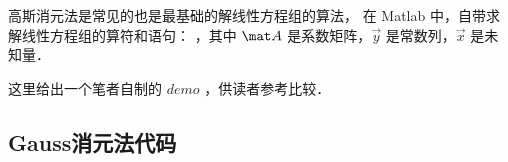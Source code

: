 

高斯消元法是常见的也是最基础的解线性方程组的算法， 在 Matlab 中，自带求解线性方程组的算符和语句： ，其中 $\mat A$ 是系数矩阵，$\vec y$ 是常数列，$\vec x$ 是未知量．

这里给出一个笔者自制的 $demo$ ，供读者参考比较．

\subsection{Gauss消元法代码}

